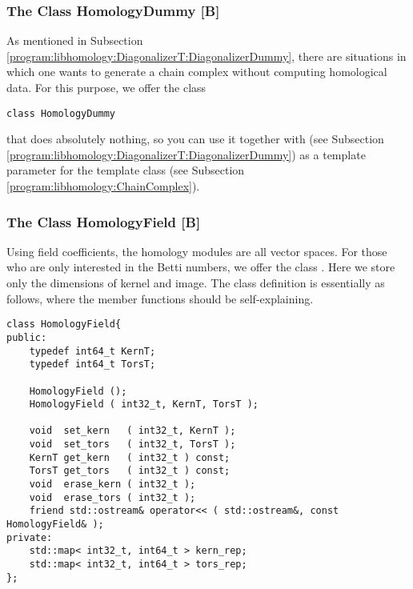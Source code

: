 \subsubsection{The Class HomologyDummy [B]}
\label{program:libhomology:HomologyT:HomologyDummy}
As mentioned in Subsection \ref{program:libhomology:DiagonalizerT:DiagonalizerDummy}, there are situations in which one wants to generate a chain complex without computing homological data.
For this purpose, we offer the class
\begin{lstlisting}
class HomologyDummy
\end{lstlisting}
that does absolutely nothing, so you can use it together with  (see Subsection \ref{program:libhomology:DiagonalizerT:DiagonalizerDummy})
as a template parameter for the template class  (see Subsection \ref{program:libhomology:ChainComplex}).

\subsubsection{The Class HomologyField [B]}
Using field coefficients, the homology modules are all vector spaces.
For those who are only interested in the Betti numbers, we offer the class .
Here we store only the dimensions of kernel and image.
The class definition is essentially as follows, where the member functions should be self-explaining.
\begin{lstlisting}
class HomologyField{
public:
    typedef int64_t KernT;
    typedef int64_t TorsT;
    
    HomologyField ();
    HomologyField ( int32_t, KernT, TorsT );
    
    void  set_kern   ( int32_t, KernT );
    void  set_tors   ( int32_t, TorsT );
    KernT get_kern   ( int32_t ) const;
    TorsT get_tors   ( int32_t ) const;
    void  erase_kern ( int32_t );
    void  erase_tors ( int32_t );
    friend std::ostream& operator<< ( std::ostream&, const HomologyField& );
private:
    std::map< int32_t, int64_t > kern_rep;
    std::map< int32_t, int64_t > tors_rep;
};
\end{lstlisting}

